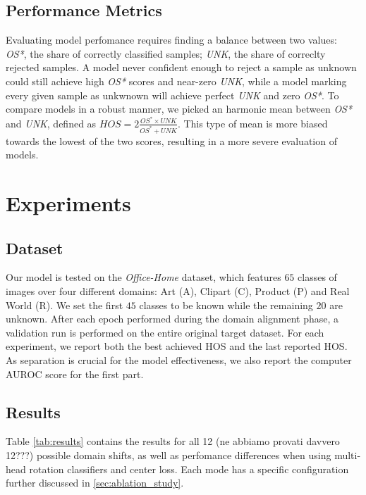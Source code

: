 \documentclass[10pt,twocolumn,letterpaper]{article}
\begin{document}
\subsection{Performance Metrics}
\label{sec:performance_metrics}

Evaluating model perfomance requires finding a balance between two values:
{\it OS*}, the share of correctly classified samples;
{\it UNK}, the share of correclty rejected samples.
A model never confident enough to reject a sample as unknown could still achieve high {\it OS*} scores and near-zero {\it UNK}, while a model marking every given sample as unkwnown will achieve perfect {\it UNK} and zero {\it OS*}.
To compare models in a robust manner, we picked an harmonic mean between {\it OS*} and {\it UNK}, defined as $HOS = 2\frac{OS^*\times UNK}{OS^*+UNK}$.
This type of mean is more biased towards the lowest of the two scores, resulting in a more severe evaluation of models.

\section{Experiments}
\label{sec:experiments}

\subsection{Dataset}
\label{sec:dataset}

Our model is tested on the {\it Office-Home} dataset\cite{OfficeHomeDataset}, which features $65$ classes of images over four different domains: Art (A), Clipart (C), Product (P) and Real World (R).
We set the first $45$ classes to be known while the remaining $20$ are unknown.
After each epoch performed during the domain alignment phase, a validation run is performed on the entire original target dataset.
For each experiment, we report both the best achieved HOS and the last reported HOS.
As separation is crucial for the model effectiveness, we also report the computer AUROC score for the first part.

\subsection{Results}
\label{sec:results}
Table \ref{tab:results} contains the results for all 12 (ne abbiamo provati davvero 12???) possible domain shifts, as well as perfomance differences when using multi-head rotation classifiers and center loss.
Each mode has a specific configuration further discussed in \ref{sec:ablation_study}.
\end{document}
